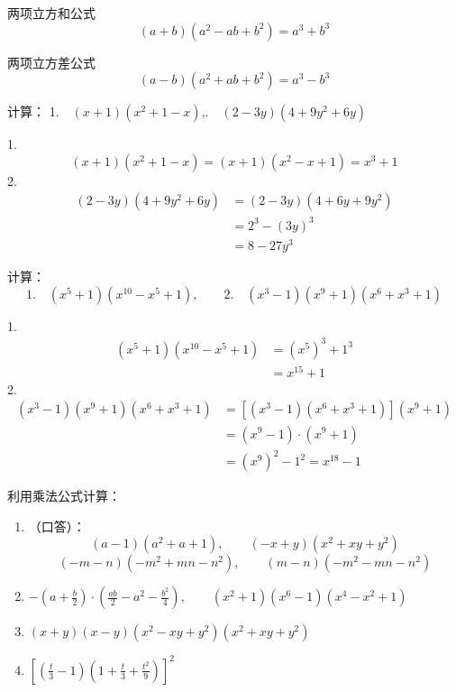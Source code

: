 \begin{blk}{两项立方和公式}
    \begin{equation*}
        (a+b)(a^2-ab+b^2)=a^3+b^3 \tag{VI}  
    \end{equation*}
\end{blk}

\begin{blk}{两项立方差公式}
    \begin{equation*}
        (a-b)(a^2+ab+b^2)=a^3-b^3 \tag{VII}  
    \end{equation*}
\end{blk}

\begin{example}
    计算：
    1.$\quad(x+1)(x^2+1-x)$,.$\quad(2-3y)(4+9y^2+6y)$ 
\end{example}

\begin{solution}

    1.\[(x+1)(x^2+1-x)=(x+1)(x^2-x+1)
    =x^3+1
\]
2.\[\begin{split}
    (2-3y)(4+9y^2+6y) &= (2-3y)(4+6y+9y^2)\\
    &=2^3-(3y)^3\\
    &=8-27y^3 
\end{split}\]
\end{solution}

\begin{example}
    计算：
    \[1.\quad(x^5+1)(x^{10}-x^5+1),\qquad 2.\quad(x^3-1)(x^9+1)(x^6+x^3+1)\]
\end{example}

\begin{solution}
    1.\[\begin{split}
        (x^5+1)(x^{10}-x^5+1)&=(x^5)^3+1^3\\
        &=x^{15}+1
    \end{split}\]
    2.\[\begin{split}
        (x^3-1)(x^9+1)(x^6+x^3+1)& = [(x^3-1)(x^6+x^3+1)](x^9+1)\\
&=(x^9-1)\cdot (x^9+1)\\
&=(x^9)^2-1^2= x^{18}-1
    \end{split}\]
\end{solution}

\begin{ex}
  利用乘法公式计算：
\begin{enumerate}
    \item （口答）：
    \[(a-1)(a^2+a+1),\qquad (-x+y)(x^2+xy+y^2)\] 
    \[(-m-n)(-m^2+mn-n^2),\qquad (m-n)(-m^2-mn-n^2)\]
    \item $-\left(a+\frac{b}{2}\right)\cdot \left(\frac{ab}{2}-a^2-\frac{b^2}{4}\right),\qquad (x^2+1)(x^6-1)(x^4-x^2+1) $
    \item $(x+y)(x-y)(x^2-xy+y^2)(x^2+xy+y^2)$
    \item $\left[\left(\frac{t}{3}-1\right)\left(1+\frac{t}{3}+\frac{t^2}{9}\right) \right]^2$
\end{enumerate}
\end{ex}

